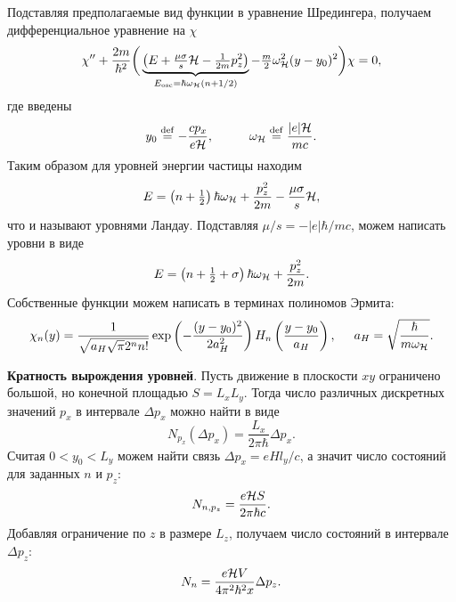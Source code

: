 Подставляя предполагаемые вид функции в уравнение Шредингера, получаем дифференциальное уравнение на $\chi$
\begin{equation*}
	\chi'' + \frac{2m}{\hbar^2} \bigg(
		\underbrace{\left(E + \tfrac{\mu \sigma}{s}\mathcal{H} - \tfrac{1}{2m} p_z^2\right)}_{E_{\textnormal{osc}} = \hbar \omega_{\mathcal{H}} (n +1/2)} - \tfrac{m}{2} \omega_{\mathcal{H}}^2 (y-y_0)^2
	\bigg) \chi = 0,
\end{equation*}
где введены
\begin{equation*}
	y_0 \overset{\mathrm{def}}{=} - \frac{c p_x}{e \H},
	\hspace{10 mm} 
	\omega_\H \overset{\mathrm{def}}{=}  \frac{|e| \H}{m c}.
\end{equation*}
Таким образом для уровней энергии частицы находим
\begin{equation*}
	E = \left(n + \tfrac{1}{2}\right) \hbar \omega_{\mathcal{H}} + \frac{p_z^2}{2m} - \frac{\mu \sigma}{s}\mathcal{H},
\end{equation*}
что и называют уровнями Ландау. Подставляя $\mu/s = -|e| \hbar / mc$, можем написать уровни в виде
\begin{equation*}
	E = \left(n + \tfrac{1}{2} + \sigma\right) \hbar \omega_{\mathcal{H}} + \frac{p_z^2}{2m}.
\end{equation*}
Собственные функции можем написать в терминах полиномов Эрмита:
\begin{equation*}
	\chi_n (y) = \frac{1}{\sqrt{a_H \sqrt{\pi} 2^n n!}} \exp\left(
		- \frac{(y-y_0)^2}{2 a_H^2}
	\right) H_n \left(\frac{y-y_0}{a_H}\right),
	\hspace{5 mm} 
	a_H = \sqrt{\frac{\hbar}{m \omega_{\mathcal{H}}}}.
\end{equation*}


\textbf{Кратность вырождения уровней}. Пусть движение в плоскости $xy$ ограничено большой, но конечной площадью $S = L_x L_y$. Тогда число различных дискретных значений $p_x$ в интервале $\Delta p_x$  можно найти в виде
\begin{equation*}
	N_{p_x}(\Delta p_x) = \frac{L_x}{2 \pi \hbar} \Delta p_x.
\end{equation*}
Считая $0 < y_0 < L_y$ можем найти связь $\Delta p_x = e H l_y / c$, а значит число состояний для заданных $n$ и $p_z$:
\begin{equation*}
	N_{n,p_z} = \frac{e \mathcal{H} S}{2\pi \hbar c}.
\end{equation*}
Добавляя ограничение по $z$ в размере $L_z$, получаем число состояний в интервале $\Delta p_z$:
\begin{equation*}
	N_n = \frac{e \mathcal{H} V}{4 \pi^2 \hbar^2 x} \Delta p_z.
\end{equation*}